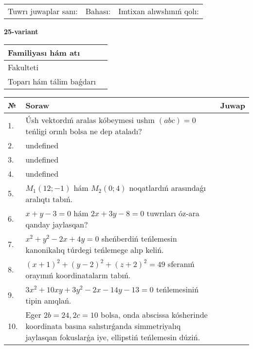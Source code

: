 \documentclass{article}
\begin{document}
\vspace{0.7cm}

\begin{tabular}{lll}
Tuwrı juwaplar sanı: \underline{\hspace{1cm}} & 
Bahası: \underline{\hspace{1cm}} & 
Imtixan alıwshınıń qolı: \underline{\hspace{2cm}} \\
\end{tabular}

\egroup

\newpage


\textbf{25-variant}\\

\bgroup
\def\arraystretch{1.6} %

\begin{tabular}{|m{5.7cm}|m{9.5cm}|}
\hline
Familiyası hám atı & \\
\hline
Fakulteti  & \\
\hline
Toparı hám tálim baǵdarı  & \\
\hline
\end{tabular}

\vspace{0.7cm}

\begin{tabular}{|m{0.7cm}|m{10cm}|m{4cm}|}
\hline
№ & Soraw & Juwap \\
\hline
1. & Úsh vektordıń aralas kóbeymesi ushın \((abc) = 0\) teńligi orınlı bolsa ne dep ataladı? &  \\
\hline
2. & undefined &  \\
\hline
3. & undefined &  \\
\hline
4. & undefined &  \\
\hline
5. & \(M_{1} (12; - 1)\) hám \(M_{2} (0;4)\) noqatlardıń arasındaǵı aralıqtı tabıń. &  \\
\hline
6. & \(x + y - 3 = 0\) hám \(2 x + 3 y - 8 = 0\) tuwrıları óz-ara qanday jaylasqan? &  \\
\hline
7. & \(x^{2} + y^{2} - 2 x + 4 y = 0\) sheńberdiń teńlemesin kanonikalıq túrdegi teńlemege alıp keliń. &  \\
\hline
8. & \((x + 1) ^{2} + (y - 2) ^{2} + (z + 2) ^{2} = 49\) sferanıń orayınıń koordinataların tabıń. &  \\
\hline
9. & \(3 x^{2} + 10 xy + 3 y^{2} - 2 x - 14 y - 13 = 0\) teńlemesiniń tipin anıqlań. &  \\
\hline
10. & Eger \(2 b = 24, 2 c = 10\) bolsa, onda abscissa kósherinde koordinata basına salıstırǵanda simmetriyalıq jaylasqan fokuslarǵa iye, ellipstiń teńlemesin dúziń. & \\
\hline
\end{tabular}
\end{document}
